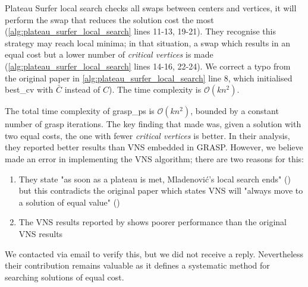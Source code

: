 



Plateau Surfer local search checks all swaps between centers and vertices, it will perform the swap that reduces the solution cost the most (\cref{alg:plateau_surfer_local_search} lines 11-13, 19-21). They recognise this strategy may reach local minima; in that situation, a swap which results in an equal cost but a lower number of \emph{critical vertices} is made (\cref{alg:plateau_surfer_local_search} lines 14-16, 22-24). We correct a typo from the original paper in \cref{alg:plateau_surfer_local_search} line 8, which initialised best\_cv with $\bar{C}$ instead of $C$). The time complexity is $\mathcal{O}(kn^2)$.

The total time complexity of \acrshort{grasp_ps} is $\mathcal{O}(kn^2)$, bounded by a constant number of \acrshort{grasp} iterations. The key finding that \textcite{battiti_new_2017} made was, given a solution with two equal costs, the one with fewer \emph{critical vertices} is better. In their analysis, they reported better results than VNS embedded in GRASP. However, we believe \textcite{battiti_new_2017} made an error in implementing the VNS algorithm; there are two reasons for this:
\begin{enumerate}
    \item They state "as soon as a plateau is met, Mladenovi\'{c}’s local search ends" (\cite{battiti_new_2017}) but this contradicts the original paper which states VNS will "always move to a solution of equal value" (\cite{mladenovic_solving_2003})
    \item The VNS results reported by \citeauthor{battiti_new_2017} shows poorer performance than the original VNS results
\end{enumerate}

We contacted \citeauthor{battiti_new_2017} via email to verify this, but we did not receive a reply. Nevertheless their contribution remains valuable as it defines a systematic method for searching solutions of equal cost.